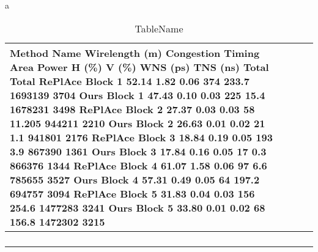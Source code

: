 a﻿\begin{table}
\centering
\caption{TableName}
\begin{tabular}{|l|l|l|l|}
\hline

Method	Name	Wirelength (m)	Congestion		Timing		Area	Power 			H (\%)	V (\%)	WNS (ps)	TNS (ns)	Total	Total RePlAce	Block 1	52.14	1.82	0.06	374	233.7	1693139	3704 Ours	Block 1	47.43	0.10	0.03	225	15.4	1678231	3498 RePlAce	Block 2	27.37	0.03	0.03	58	11.205	944211	2210 Ours	Block 2	26.63	0.01	0.02	21	1.1	941801	2176 RePlAce	Block 3	18.84	0.19	0.05	193	3.9	867390	1361 Ours	Block 3	17.84	0.16	0.05	17	0.3	866376	1344 RePlAce	Block 4	61.07	1.58	0.06	97	6.6	785655	3527 Ours	Block 4	57.31	0.49	0.05	64	197.2	694757	3094 RePlAce	Block 5	31.83	0.04	0.03	156	254.6	1477283	3241 Ours	Block 5	33.80	0.01	0.02	68	156.8	1472302	3215 &  &  &  \\ \hline
 &  &  &  \\ \hline
 &  &  &  \\ \hline
 &  &  &  \\ \hline
 &  &  &  \\ \hline

\end{tabular}
\end{table}